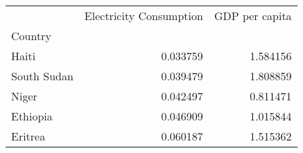 \begin{tabular}{lrr}
\toprule
{} &  Electricity Consumption &  GDP per capita \\
Country     &                          &                 \\
\midrule
Haiti       &                 0.033759 &        1.584156 \\
South Sudan &                 0.039479 &        1.808859 \\
Niger       &                 0.042497 &        0.811471 \\
Ethiopia    &                 0.046909 &        1.015844 \\
Eritrea     &                 0.060187 &        1.515362 \\
\bottomrule
\end{tabular}
